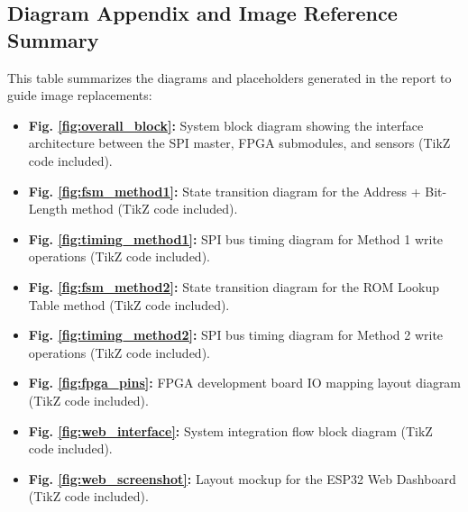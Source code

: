 \documentclass[conference]{IEEEtran}
\begin{document}
\subsection{Diagram Appendix and Image Reference Summary}
This table summarizes the diagrams and placeholders generated in the report to guide image replacements:
\begin{itemize}
    \item \textbf{Fig. \ref{fig:overall_block}:} System block diagram showing the interface architecture between the SPI master, FPGA submodules, and sensors (TikZ code included).
    \item \textbf{Fig. \ref{fig:fsm_method1}:} State transition diagram for the Address + Bit-Length method (TikZ code included).
    \item \textbf{Fig. \ref{fig:timing_method1}:} SPI bus timing diagram for Method 1 write operations (TikZ code included).
    \item \textbf{Fig. \ref{fig:fsm_method2}:} State transition diagram for the ROM Lookup Table method (TikZ code included).
    \item \textbf{Fig. \ref{fig:timing_method2}:} SPI bus timing diagram for Method 2 write operations (TikZ code included).
    \item \textbf{Fig. \ref{fig:fpga_pins}:} FPGA development board IO mapping layout diagram (TikZ code included).
    \item \textbf{Fig. \ref{fig:web_interface}:} System integration flow block diagram (TikZ code included).
    \item \textbf{Fig. \ref{fig:web_screenshot}:} Layout mockup for the ESP32 Web Dashboard (TikZ code included).
\end{itemize}
\end{document}
